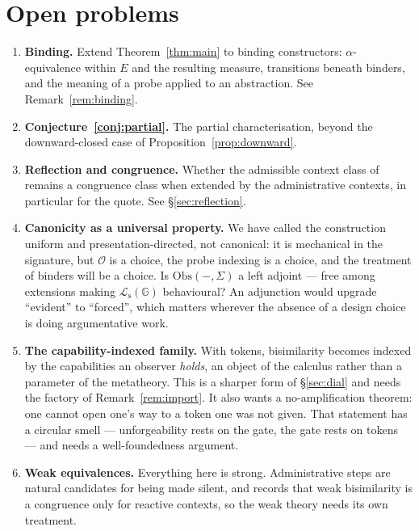 \documentclass[11pt]{article}
\theoremstyle{plain}
\theoremstyle{definition}
\newcommand{\Gg}{\mathbb{G}}
\newcommand{\Lo}{\mathcal{L}}
\newcommand{\Obs}{\mathrm{Obs}}
\newcommand{\Ob}{\mathcal{O}}
\begin{document}
\section{Open problems}
\label{sec:open}

\begin{enumerate}
\item \label{prob:binding} \textbf{Binding.} Extend Theorem~\ref{thm:main} to binding constructors:
$\alpha$-equivalence within $E$ and the resulting measure, transitions beneath binders, and the meaning
of a probe applied to an abstraction. See Remark~\ref{rem:binding}.

\item \textbf{Conjecture~\ref{conj:partial}.} The partial characterisation, beyond the downward-closed
case of Proposition~\ref{prop:downward}.

\item \label{prob:reflection} \textbf{Reflection and congruence.} Whether the admissible context class
of \cite{BIHOL} remains a congruence class when extended by the administrative contexts, in particular
for the quote. See \S\ref{sec:reflection}.

\item \textbf{Canonicity as a universal property.} We have called the construction uniform and
presentation-directed, not canonical: it is mechanical in the signature, but $\Ob$ is a choice, the
probe indexing is a choice, and the treatment of binders will be a choice. Is $\Obs(-,\Sigma)$ a left
adjoint --- free among extensions making $\Lo_{\mathrm{s}}(\Gg)$ behavioural? An adjunction would
upgrade ``evident'' to ``forced'', which matters wherever the absence of a design choice is doing
argumentative work.

\item \textbf{The capability-indexed family.} With tokens, bisimilarity becomes indexed by the
capabilities an observer \emph{holds}, an object of the calculus rather than a parameter of the
metatheory. This is a sharper form of \S\ref{sec:dial} and needs the factory of
Remark~\ref{rem:import}. It also wants a no-amplification theorem: one cannot open one's way to a token
one was not given. That statement has a circular smell --- unforgeability rests on the gate, the gate
rests on tokens --- and needs a well-foundedness argument.

\item \textbf{Weak equivalences.} Everything here is strong. Administrative steps are natural candidates
for being made silent, and \cite{BIHOL} records that weak bisimilarity is a congruence only for reactive
contexts, so the weak theory needs its own treatment.


\end{enumerate}
\end{document}
